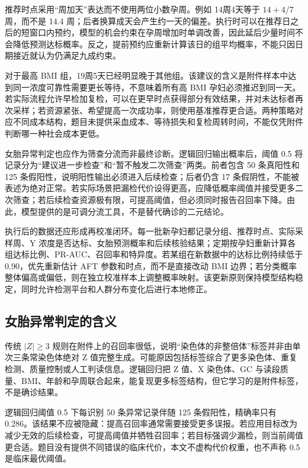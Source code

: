 \documentclass[UTF8,a4paper,12pt]{ctexart}
\begin{document}
推荐时点采用“周加天”表达而不使用两位小数孕周。例如 14周4天等于 $14+4/7$ 周，而不是 14.4 周；后者换算成天会产生约一天的偏差。执行时可以在推荐日之后的短窗口内预约，模型的机会约束在孕周增加时单调改善，因此延后少量时间不会降低预测达标概率。反之，提前预约应重新计算该日的组平均概率，不能只因日期接近就认为仍满足九成约束。

对于最高 BMI 组，19周5天已经明显晚于其他组。该建议的含义是附件样本中达到同一浓度可靠性需要更长等待，不意味着所有高 BMI 孕妇必须推迟到同一天。若实际流程允许早检加复检，可以在更早时点获得部分有效结果，并对未达标者再次采样；若资源紧张、希望提高一次成功率，则使用基准推荐更合适。两种策略对应不同成本结构，题目未提供采血成本、等待损失和复检周转时间，不能仅凭附件判断哪一种社会成本更低。

女胎异常判定也应作为筛查分流而非最终诊断。逻辑回归输出概率后，阈值 0.5 将记录分为“建议进一步检查”和“暂不触发二次筛查”两类。前者包含 50 条真阳性和 125 条假阳性，说明阳性输出必须进入后续检查；后者仍含 17 条假阴性，不能被表述为绝对正常。若实际场景把漏检代价设得更高，应降低概率阈值并接受更多二次筛查；若后续检查资源极有限，可提高阈值，但必须同时报告召回率下降。由此，模型提供的是可调分流工具，不是替代确诊的二元结论。

执行后的数据还应形成再校准闭环。每一批新孕妇都记录分组、推荐时点、实际采样周、Y 浓度是否达标、女胎预测概率和后续核验结果；定期按孕妇重新计算各组达标比例、PR-AUC、召回率和特异度。若某组在新数据中的达标比例持续低于 0.90，优先重新估计 AFT 参数和时点，而不是直接改动 BMI 边界；若分类概率整体偏高或偏低，则在独立校准样本上调整概率映射。该更新原则保持模型结构稳定，同时允许检测平台和人群分布变化后进行本地修正。

\subsection{女胎异常判定的含义}

传统 $|Z|\ge3$ 规则在附件上的召回率很低，说明“染色体的非整倍体”标签并非由单次三条常染色体绝对 Z 值完整生成。可能原因包括标签综合了更多染色体、重复检测、质量控制或人工判读信息。逻辑回归把 Z 值、X 染色体、GC 与读段质量、BMI、年龄和孕周联合起来，能复现更多标签结构，但它学习的是附件标签，不是确诊结果。

逻辑回归阈值 0.5 下每识别 50 条异常记录伴随 125 条假阳性，精确率只有 0.286。该结果不应被隐藏：提高召回率通常需要接受更多误报。若应用目标改为减少无效的后续检查，可提高阈值并牺牲召回率；若目标强调少漏检，则当前阈值更合适。题目没有提供不同错误的临床代价，本文不虚构代价权重，也不声称 0.5 是临床最优阈值。
\end{document}
